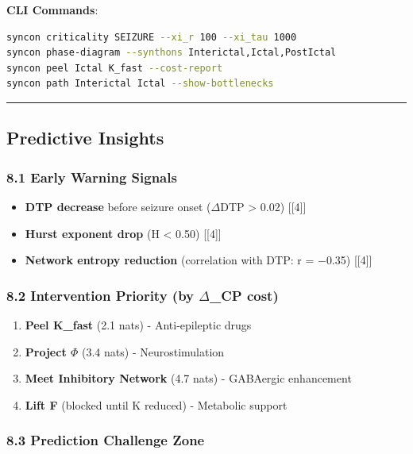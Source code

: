 \documentclass[12pt,a4paper]{article}
\begin{document}
\textbf{CLI Commands}:

\begin{lstlisting}[language=bash]
syncon criticality SEIZURE --xi_r 100 --xi_tau 1000
syncon phase-diagram --synthons Interictal,Ictal,PostIctal
syncon peel Ictal K_fast --cost-report
syncon path Interictal Ictal --show-bottlenecks
\end{lstlisting}

\begin{center}
\rule{0.5\textwidth}{0.4pt}
\end{center}

\subsection{Predictive Insights}

\subsubsection{\textbf{8.1 Early Warning Signals}}

\begin{itemize}
    \item \textbf{DTP decrease} before seizure onset ($\Delta$DTP \textgreater{} 0.02) {[}{[}4{]}{]}
    \item \textbf{Hurst exponent drop} (H \textless{} 0.50) {[}{[}4{]}{]}
    \item \textbf{Network entropy reduction} (correlation with DTP: r = $-$0.35) {[}{[}4{]}{]}
\end{itemize}

\subsubsection{\textbf{8.2 Intervention Priority} (by $\Delta$\xi\_CP cost)}

\begin{enumerate}
    \item \textbf{Peel K\_fast} (2.1 nats) - Anti-epileptic drugs
    \item \textbf{Project $\Phi$} (3.4 nats) - Neurostimulation
    \item \textbf{Meet Inhibitory Network} (4.7 nats) - GABAergic enhancement
    \item \textbf{Lift F} (blocked until K reduced) - Metabolic support
\end{enumerate}

\subsubsection{\textbf{8.3 Prediction Challenge Zone}}
\end{document}
